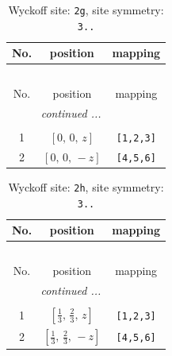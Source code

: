 \documentclass[fleqn,8pt]{jsarticle}
\begin{document}
\renewcommand{\arraystretch}{1.2}
\begin{longtable}{ccc}
\caption{Wyckoff site: {\tt 2g}, site symmetry: {\tt 3..}}
 \\
 \hline \hline
No. & position & mapping \\ \hline \endfirsthead

\multicolumn{2}{l}{\tablename\ \thetable{}} \\
 \hline \hline
No. & position & mapping \\ \hline \endhead

 \hline \hline
\multicolumn{2}{r}{\footnotesize\it continued ...} \\ \endfoot

 \hline \hline
\multicolumn{2}{r}{} \\ \endlastfoot

1 & $\left[ 0,\, 0,\, z \right]$ & {\tt [1,2,3]} \\ \hline
2 & $\left[ 0,\, 0,\, - z \right]$ & {\tt [4,5,6]} \\
\end{longtable}
\renewcommand{\arraystretch}{1.2}
\begin{longtable}{ccc}
\caption{Wyckoff site: {\tt 2h}, site symmetry: {\tt 3..}}
 \\
 \hline \hline
No. & position & mapping \\ \hline \endfirsthead

\multicolumn{2}{l}{\tablename\ \thetable{}} \\
 \hline \hline
No. & position & mapping \\ \hline \endhead

 \hline \hline
\multicolumn{2}{r}{\footnotesize\it continued ...} \\ \endfoot

 \hline \hline
\multicolumn{2}{r}{} \\ \endlastfoot

1 & $\left[ \frac{1}{3},\, \frac{2}{3},\, z \right]$ & {\tt [1,2,3]} \\ \hline
2 & $\left[ \frac{1}{3},\, \frac{2}{3},\, - z \right]$ & {\tt [4,5,6]} \\
\end{longtable}
\renewcommand{\arraystretch}{1.2}
\end{document}
